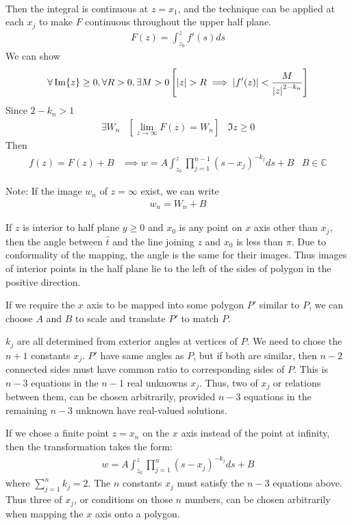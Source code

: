 \documentclass[12pt, english]{book}
\makeatletter
\renewenvironment{proof}[1][\proofname]{\par
	\pushQED{\qed}%
	\normalfont \topsep6\p@\@plus6\p@\relax
	\list{}{%
		\settowidth{\leftmargin}{\itshape\proofname:\hskip\labelsep}%
		\setlength{\labelwidth}{0pt}%
		\setlength{\itemindent}{-\leftmargin}%
		}%
	\item[\hskip\labelsep\itshape#1\@addpunct{:}]\ignorespaces
	}{\popQED\endlist\@endpefalse}
\makeatother
\begin{document}
\begin{proof}
\begin{align*}
		\end{align*}
		Then the integral is continuous at \(z = x_1\), and the technique can be applied at each \(x_j\) to make \(F\) continuous throughout the upper half plane.
		\begin{align*}
			F(z) = \int_{z_0}^{z} f'(s) ds
		\end{align*}
		We can show
		\begin{align*}
			\forall \Im{z}\geq 0, \forall R >0, \exists M>0
			\left[\abs{z}>R \implies \abs{f'(z)} < \frac{M}{\abs{z}^{2-k_n}}\right]
		\end{align*}
		Since \(2-k_n > 1\)
		\begin{align*}
			\exists W_n &\left[\lim_{z\rightarrow \infty} F(z) = W_n\right]	&
			\Im{z} \geq 0
		\end{align*}
		Then 
		\begin{align*}
			f(z) = F(z) + B 
			&\implies w = A \int_{z_0}^{z} \prod_{j = 1}^{n-1} (s-x_j)^{-k_j} ds + B &
			B \in \mathbb{C}
		\end{align*}
	\end{proof}
	
	Note: If the image \(w_n\) of \(z = \infty\) exist, we can write
	\begin{align*}
		w_n = W_n + B
	\end{align*}
	
	If \(z\) is interior to half plane \(y \geq 0\) and \(x_0\) is any point on \(x\) axis other than \(x_j\), then the angle between \(\hat{t}\) and the line joining \(z\) and \(x_0\) is less than \(\pi\). Due to conformality of the mapping, the angle is the same for their images. Thus images of interior points in the half plane lie to the left of the sides of polygon in the positive direction.
	
	If we require the \(x\) axis to be mapped into some polygon \(P'\) similar to \(P\), we can choose \(A\) and \(B\) to scale and translate \(P'\) to match \(P\).
	
	\(k_j\) are all determined from exterior angles at vertices of \(P\). We need to chose the \(n + 1\) constants \(x_j\). \(P'\) have same angles as \(P\), but if both are similar, then \(n-2\) connected sides must have common ratio to corresponding sides of \(P\). This is \(n-3\) equations in the \(n-1\) real unknowns \(x_j\). Thus, two of \(x_j\) or relations between them, can be chosen arbitrarily, provided \(n-3\) equations in the remaining \(n-3\) unknown have real-valued solutions.
	
	If we chose a finite point \(z=x_n\) on the \(x\) axis instead of the point at infinity, then the transformation takes the form:
	\begin{align*}
		w = A \int_{z_0}^{z} \prod_{j=1}^{n} (s-x_j)^{-k_j} ds + B
	\end{align*}
	where \(\sum_{j=1}^{n} k_j = 2\). The \(n\) constants \(x_j\) must satisfy the \(n-3\) equations above. Thus three of \(x_j\), or conditions on those \(n\) numbers, can be chosen arbitrarily when mapping the \(x\) axis onto a polygon.
	
\end{document}
